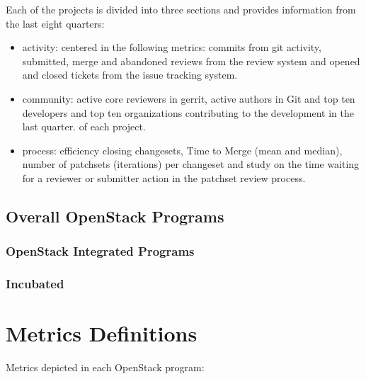 \documentclass[a4wide,11pt]{report}
\begin{document}
Each of the projects is divided into three sections and provides information from the last eight quarters: 
\begin{itemize}
\item activity: centered in the following metrics: commits from git activity, submitted, merge and abandoned reviews from the review system and
opened and closed tickets from the issue tracking system. 
\item community: active core reviewers in gerrit, active authors in Git and top ten developers and top ten organizations contributing to the development in the last quarter.
of each project.
\item process: efficiency closing changesets, Time to Merge (mean and median), number of patchsets (iterations) per changeset and study on the time waiting for a reviewer or submitter action in the patchset review process.
\end{itemize}


\newpage
\section{Overall OpenStack Programs}


\newpage
\subsection{OpenStack Integrated Programs}


\newpage
\subsection{Incubated}




\appendix{}

\chapter{Metrics Definitions}
\label{chap:metrics_definitions}

Metrics depicted in each OpenStack program:
\end{document}
